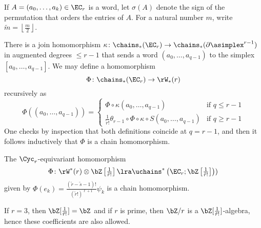 If $A=(a_0,\ldots,a_k)\in \EC_r$ is a word, let $\sigma(A)$ denote the sign of the permutation that orders the entries of $A$. For a natural number $m$, write $\tilde{m} = \left\lfloor \frac{m}{2}\right\rfloor$.

There is a join homomorphism $\kappa\colon \chains_*(\EC_r)\to \chains_*(\partial \asimplex^{r-1})$ in augmented degrees $\leq r-1$ that sends a word $(a_0,\ldots,a_{q-1})$ to the simplex $[a_0,\ldots,a_{q-1}]$. We may define a homomorphism
\[
    \Phi\colon \chains_*(\EC_r)\to \rW_*(r)
\]
recursively as 
\[
    \Phi((a_0,\ldots,a_{q-1})) = \begin{cases}
        \Phi\circ \kappa(a_0,\ldots,a_{q-1}) & \text{if $q\leq r-1$} \\
        \frac{1}{\tilde{r}!}\theta_{r-1}\circ \Phi\circ\kappa\circ S(a_0,\ldots,a_{q-1}) & \text{if $q\geq r-1$}
    \end{cases}
\]
One checks by inspection that both definitions coincide at $q=r-1$, and then it follows inductively that $\Phi$ is a chain homomorphism.



\begin{theorem}\label{thm:map_phi}
	The $\Cyc_r$-equivariant homomorphism 
 \[
 \Phi\colon \rW^*(r)\otimes\bZ\left[{\textstyle\frac{1}{\tilde{r}!}}\right]\lra \uchains^*\left(\EC_r; \bZ\left[{\textstyle\frac{1}{\tilde{r}!}}\right]\right))
 \]
 given by $\Phi(e_k)= \frac{(\tilde{r}-\tilde{s}-1)!}{(\tilde{r}!)^{\ell+1}}\psi_k$ is a chain homomorphism.
\end{theorem}

\begin{remark}
	If $r=3$, then $\bZ[\frac{1}{\tilde{r}!}] = \bZ$ and if $r$ is prime, then $\bZ/r$ is a $\bZ[\frac{1}{\tilde{r}!}]$-algebra, hence these coefficients are also allowed.
\end{remark}




